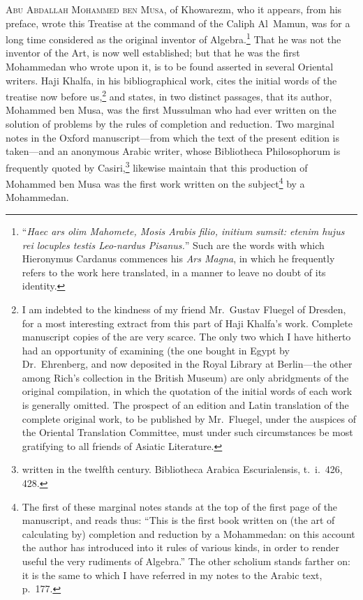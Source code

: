 \textsc{Abu Abdallah Mohammed ben Musa,} of Khowarezm, who it appears, from his preface, wrote this Treatise at the command of the Caliph Al~Mamun, was for a long time considered as the original inventor of Algebra.\footnote{``\textit{Haec ars olim Mahomete, Mosis Arabis filio, initium sumsit: etenim hujus rei locuples testis Leo-nardus Pisanus.}'' Such are the words with which Hieronymus Cardanus commences his \textit{Ars Magna}, in which he frequently refers to the work here translated, in a manner to leave no doubt of its identity.} That he was not the inventor of the Art, is now well established; but that he was the first Mohammedan who wrote upon it, is to be found asserted in several Oriental writers. Haji Khalfa, in his bibliographical work, cites the initial words of the treatise now before us,\footnote{I am indebted to the kindness of my friend Mr.~Gustav Fluegel of Dresden, for a most interesting extract from this part of Haji Khalfa's work. Complete manuscript copies of the  are very scarce. The only two which I have hitherto had an opportunity of examining (the one bought in Egypt by Dr.~Ehrenberg, and now deposited in the Royal Library at Berlin---the other among Rich's collection in the British Museum) are only abridgments of the original compilation, in which the quotation of the initial words of each work is generally omitted. The prospect of an edition and Latin translation of the complete original work, to be published by Mr.~Fluegel, under the auspices of the Oriental Translation Committee, must under such circumstances be most gratifying to all friends of Asiatic Literature.} and states, in two distinct passages, that its author, Mohammed ben Musa, was the first Mussulman who had ever written on the solution of problems by the rules of completion and reduction. Two marginal notes in the Oxford manuscript---from which the text of the present edition is taken---and an anonymous Arabic writer, whose Bibliotheca Philosophorum is frequently quoted by Casiri,\footnote{ written in the twelfth century. Bibliotheca Arabica Escurialensis, t.~i.~426, 428.} likewise maintain that this production of Mohammed ben Musa was the first work written on the subject\footnote{The first of these marginal notes stands at the top of the first page of the manuscript, and reads thus:  ``This is the first book written on (the art of calculating by) completion and reduction by a Mohammedan: on this account the author has introduced into it rules of various kinds, in order to render useful the very rudiments of Algebra.'' The other scholium stands farther on: it is the same to which I have referred in my notes to the Arabic text, p.~177.} by a Mohammedan.

